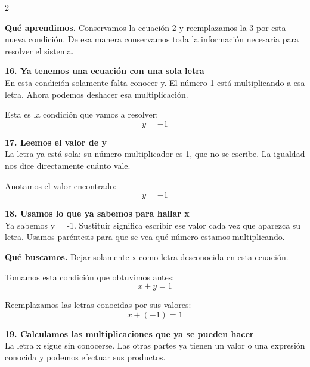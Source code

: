\documentclass[11pt,a4paper,landscape]{article}
\begin{document}
\begin{multicols*}{2}
\begin{minipage}{\linewidth}
\par\smallskip\textbf{Qué aprendimos.} Conservamos la ecuación 2 y reemplazamos la 3 por esta nueva condición. De esa manera conservamos toda la información necesaria para resolver el sistema.
\end{minipage}\par\medskip
\noindent\begin{minipage}{\linewidth}\textbf{16. Ya tenemos una ecuación con una sola letra}\\[2pt]En esta condición solamente falta conocer y. El número 1 está multiplicando a esa letra. Ahora podemos deshacer esa multiplicación.
\par\smallskip Esta es la condición que vamos a resolver:
\[y = -1\]
\end{minipage}\par\medskip
\noindent\begin{minipage}{\linewidth}\textbf{17. Leemos el valor de y}\\[2pt]La letra ya está sola: su número multiplicador es 1, que no se escribe. La igualdad nos dice directamente cuánto vale.
\par\smallskip Anotamos el valor encontrado:
\[y=-1\]
\end{minipage}\par\medskip
\noindent\begin{minipage}{\linewidth}\textbf{18. Usamos lo que ya sabemos para hallar x}\\[2pt]Ya sabemos y = -1. Sustituir significa escribir ese valor cada vez que aparezca su letra. Usamos paréntesis para que se vea qué número estamos multiplicando.
\par\smallskip\textbf{Qué buscamos.} Dejar solamente x como letra desconocida en esta ecuación.
\par\smallskip Tomamos esta condición que obtuvimos antes:
\[x + y = 1\]
\par\smallskip Reemplazamos las letras conocidas por sus valores:
\[x + \left(-1\right)=1\]
\end{minipage}\par\medskip
\noindent\begin{minipage}{\linewidth}\textbf{19. Calculamos las multiplicaciones que ya se pueden hacer}\\[2pt]La letra x sigue sin conocerse. Las otras partes ya tienen un valor o una expresión conocida y podemos efectuar sus productos.
\par{}\par\smallskip

\end{minipage}
\end{multicols*}
\end{document}

